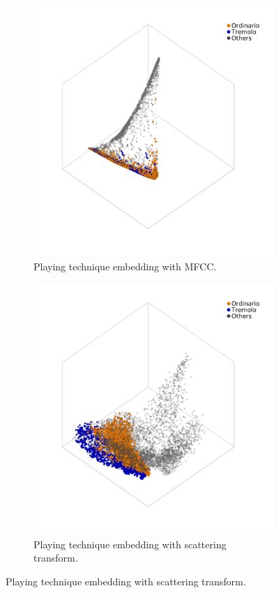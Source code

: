 \begin{figure}
        \begin{subfigure}{0.45\textwidth}
                \centering
                \includegraphics[width=\linewidth]{./figs/embeddings/mf_tech_two_dmap.png}
                \caption{Playing technique embedding with MFCC.}
                \label{fig:mf_tech_two_dmap}
        \end{subfigure}%
        \begin{subfigure}{0.45\textwidth}
                \centering
                \includegraphics[width=\linewidth]{./figs/embeddings/sc_tech_two_dmap.png}
                \caption{Playing technique embedding with scattering transform.}
                \label{fig:sc_tech_two_dmap}
        \end{subfigure}%


\end{figure}
